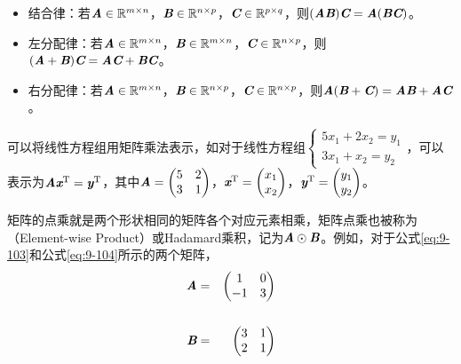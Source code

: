 \begin{itemize}
\vspace{0.5em}
\item 结合律：若${\textbf{\em A}}\in {\mathbb R}^{m\times n} $，$ {\textbf{\em B}}\in {\mathbb R}^{n\times p} $，${\textbf{\em C}}\in {\mathbb R}^{p\times q} $，则$ ({\textbf{\em A}}{\textbf{\em B}}){\textbf{\em C}}={\textbf{\em A}}({\textbf{\em B}}{\textbf{\em C}}) $。
\vspace{0.5em}
\item 左分配律：若$ {\textbf{\em A}}\in {\mathbb R}^{m\times n} $，$ {\textbf{\em B}}\in {\mathbb R}^{m\times n} $，$ {\textbf{\em C}}\in {\mathbb R}^{n\times p} $，则$ ({\textbf{\em A}}+{\textbf{\em B}}){\textbf{\em C}}={\textbf{\em A}}{\textbf{\em C}}+{\textbf{\em B}}{\textbf{\em C}} $。
\vspace{0.5em}
\item 右分配律：若$ {\textbf{\em A}}\in {\mathbb R}^{m\times n} $，$ {\textbf{\em B}}\in {\mathbb R}^{n\times p} $，$ {\textbf{\em C}}\in {\mathbb R}^{n\times p} $，则$ {\textbf{\em A}}({\textbf{\em B}}+{\textbf{\em C}})={\textbf{\em A}}{\textbf{\em B}}+{\textbf{\em A}}{\textbf{\em C}} $。
\vspace{0.5em}
\end{itemize}

\begin{spacing}{1.4}
\parinterval 可以将线性方程组用矩阵乘法表示，如对于线性方程组$ \begin{cases} 5x_1+2x_2=y_1\\3x_1+x_2=y_2\end{cases} $，可以表示为$ {\textbf{\em A}}{\textbf{\em x}}^{\textrm T}={\textbf{\em y}}^{\textrm T}$，其中$ {\textbf{\em A}} = \begin{pmatrix} 5 & 2\\3 & 1\end{pmatrix} $，$ {\textbf{\em x}}^{\textrm T} = \begin{pmatrix} x_1\\x_2\end{pmatrix} $，$ {\textbf{\em y}}^{\textrm T} = \begin{pmatrix} y_1\\y_2\end{pmatrix} $。
\end{spacing}

\parinterval 矩阵的点乘就是两个形状相同的矩阵各个对应元素相乘，矩阵点乘也被称为{\small{}}（Element-wise Product）或Hadamard乘积，记为${\textbf{\em A}}\odot {\textbf{\em B}}$。例如，对于公式\eqref{eq:9-103}和公式\eqref{eq:9-104}所示的两个矩阵，
\begin{eqnarray}
{\textbf{\em A}} &=&
\begin{pmatrix}
   1 & 0\\
   -1 & 3
\end{pmatrix}
\label{eq:9-103}
\\ \nonumber \\
{\textbf{\em B}} &=&
\begin{pmatrix}
   3 & 1\\
   2 & 1
\end{pmatrix}
\label{eq:9-104}
\end{eqnarray}


